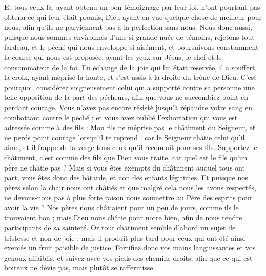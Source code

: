 \begin{multicols}{2}
Et tous ceux-là, ayant obtenu un bon témoignage par leur foi, n'ont pourtant pas obtenu ce qui leur était promis,
Dieu ayant en vue quelque chose de meilleur pour nous, afin qu'ils ne parviennent pas à la perfection sans nous.
\VerseOne{}Nous donc aussi, puisque nous sommes environnés d'une si grande nuée de témoins, rejetons tout fardeau, et le péché qui nous enveloppe si aisément, et poursuivons constamment la course qui nous est proposée,
ayant les yeux sur Jésus, le chef et le consommateur de la foi. En échange de la joie qui lui était réservée, il a souffert la croix, ayant méprisé la honte, et s'est assis à la droite du trône de Dieu.
C'est pourquoi, considérez soigneusement celui qui a supporté contre sa personne une telle opposition de la part des pécheurs, afin que vous ne succombiez point en perdant courage.
Vous n'avez pas encore résisté jusqu'à répandre votre sang en combattant contre le péché ;
et vous avez oublié l'exhortation qui vous est adressée comme à des fils : Mon fils ne méprise pas le châtiment du Seigneur, et ne perds point courage lorsqu’il te reprend ;
car le Seigneur châtie celui qu'il aime, et il frappe de la verge tous ceux qu’il reconnaît pour ses fils.
Supportez le châtiment, c’est comme des fils que Dieu vous traite, car quel est le fils qu’un père ne châtie pas ?
Mais si vous êtes exempts du châtiment auquel tous ont part, vous êtes donc des bâtards, et non des enfants légitimes.
Et puisque nos pères selon la chair nous ont châtiés et que malgré cela nous les avons respectés, ne devons-nous pas à plus forte raison nous soumettre au Père des esprits pour avoir la vie ?
Nos pères nous châtiaient pour un peu de jours, comme ils le trouvaient bon ; mais Dieu nous châtie pour notre bien, afin de nous rendre participants de sa sainteté.
Or tout châtiment semble d’abord un sujet de tristesse et non de joie ; mais il produit plus tard pour ceux qui ont été ainsi exercés un fruit paisible de justice.
Fortifiez donc vos mains languissantes et vos genoux affaiblis,
et suivez avec vos pieds des chemins droits, afin que ce qui est boiteux ne dévie pas, mais plutôt se raffermisse.

\end{multicols}
